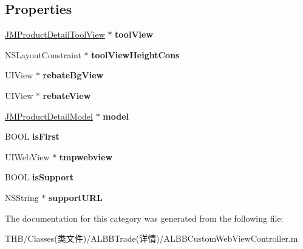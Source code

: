 \subsection*{Properties}
\begin{DoxyCompactItemize}
\item 
\mbox{\label{category_a_l_b_b_custom_web_view_controller_07_08_a17ea302e1a5358ebdcbbc375d58f6cef}} 
\mbox{\hyperlink{interface_j_m_product_detail_tool_view}{J\+M\+Product\+Detail\+Tool\+View}} $\ast$ {\bfseries tool\+View}
\item 
\mbox{\label{category_a_l_b_b_custom_web_view_controller_07_08_a918015069710508fc00c2aae8941fc29}} 
N\+S\+Layout\+Constraint $\ast$ {\bfseries tool\+View\+Height\+Cons}
\item 
\mbox{\label{category_a_l_b_b_custom_web_view_controller_07_08_a58c8dece89eebd3eed27152971e490bd}} 
U\+I\+View $\ast$ {\bfseries rebate\+Bg\+View}
\item 
\mbox{\label{category_a_l_b_b_custom_web_view_controller_07_08_a613900bc054c91566087de46f5761198}} 
U\+I\+View $\ast$ {\bfseries rebate\+View}
\item 
\mbox{\label{category_a_l_b_b_custom_web_view_controller_07_08_a323eb1fca9ca7cc1ba1802b43e29eea0}} 
\mbox{\hyperlink{interface_j_m_product_detail_model}{J\+M\+Product\+Detail\+Model}} $\ast$ {\bfseries model}
\item 
\mbox{\label{category_a_l_b_b_custom_web_view_controller_07_08_afc200396225dacc28633cddc22b3ca9e}} 
B\+O\+OL {\bfseries is\+First}
\item 
\mbox{\label{category_a_l_b_b_custom_web_view_controller_07_08_a56d9d6cffe5bbd46ad3bccaba542607b}} 
U\+I\+Web\+View $\ast$ {\bfseries tmpwebview}
\item 
\mbox{\label{category_a_l_b_b_custom_web_view_controller_07_08_a862bd6dce26038a6985bf24e386a38e9}} 
B\+O\+OL {\bfseries is\+Support}
\item 
\mbox{\label{category_a_l_b_b_custom_web_view_controller_07_08_ad0dc0909a0130689f1042716ba46655c}} 
N\+S\+String $\ast$ {\bfseries support\+U\+RL}
\end{DoxyCompactItemize}


The documentation for this category was generated from the following file\+:\begin{DoxyCompactItemize}
\item 
T\+H\+B/\+Classes(类文件)/\+A\+L\+B\+B\+Trade(详情)/A\+L\+B\+B\+Custom\+Web\+View\+Controller.\+m\end{DoxyCompactItemize}
